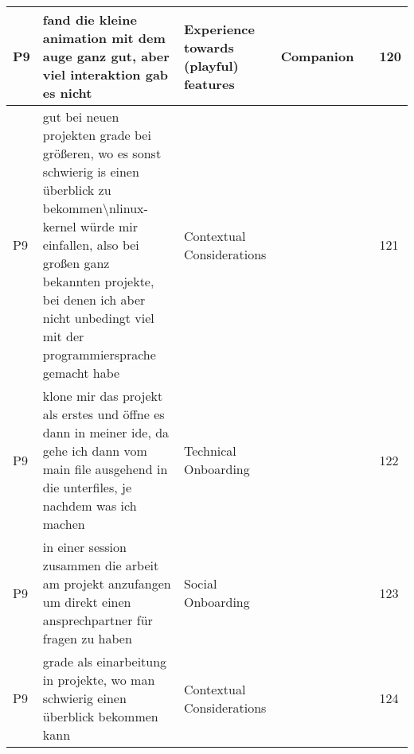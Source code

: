 \begin{appendices}
\begin{landscape}
\begin{longtable}{|p{0.8cm}|p{7cm}|p{3cm}|p{3cm}|p{5.5cm}|p{0.5cm}|}
      P9                   & fand die kleine animation mit dem auge ganz gut, aber viel interaktion gab es nicht                                                                                                                                                                                         & Experience towards (playful) features    & Companion                          &                                                                                                                                                    & 120          \\ \hline
      P9                   & gut bei neuen projekten grade bei größeren, wo es sonst schwierig is einen überblick zu bekommen\textbackslash{}nlinux-kernel würde mir einfallen, also bei großen ganz bekannten projekte, bei denen ich aber nicht unbedingt viel mit der programmiersprache gemacht habe & Contextual Considerations                &                                    &                                                                                                                                                    & 121          \\ \hline
      P9                   & klone mir das projekt als erstes und öffne es dann in meiner ide, da gehe ich dann vom main file ausgehend in die unterfiles, je nachdem was ich machen                                                                                                                     & Technical Onboarding                     &                                    &                                                                                                                                                    & 122          \\ \hline
      P9                   & in einer session zusammen die arbeit am projekt anzufangen um direkt einen ansprechpartner für fragen zu haben                                                                                                                                                              & Social Onboarding                        &                                    &                                                                                                                                                    & 123          \\ \hline
      P9                   & grade als einarbeitung in projekte, wo man schwierig einen überblick bekommen kann                                                                                                                                                                                          & Contextual Considerations                &                                    &                                                                                                                                                    & 124          \\ \hline

\end{longtable}
\end{landscape}
\end{appendices}
